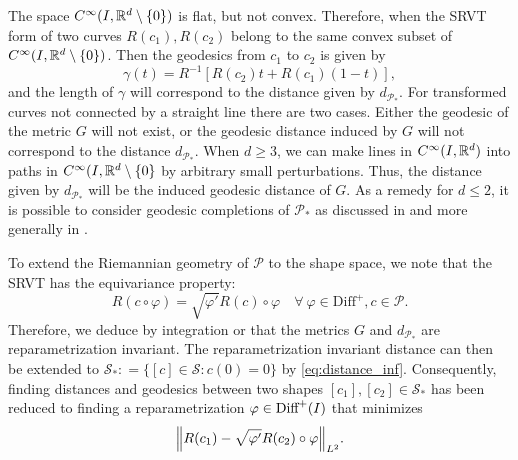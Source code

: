 The space \(C^{\infty}(I, \mathbb{R}^d \setminus \{0\}) \) is flat, but not convex. Therefore, when the SRVT form of two curves \(R(c_1), R(c_2)\) belong to the same convex subset of \(C^{\infty}(I, \mathbb{R}^d \setminus \{0\})\). Then the  geodesics from \(c_1\) to \(c_2\) is given by 
\begin{equation}
  \gamma(t) = R^{-1}[R(c_2)t +  R(c_1)(1-t)], 
\end{equation}
and the length of \(\gamma\) will correspond to the distance given by \(d_{\mathcal{P}_*}\). For transformed curves not connected by a straight line there are two cases. Either the geodesic of the metric \(G\) will not exist, or the geodesic distance induced by \(G\) will not correspond to the  distance \(d_{\mathcal{P}_*}\). When \(d \geq 3\),  we can make lines in \(C^{\infty}(I, \mathbb{R}^d )\) into paths in \(C^{\infty}(I, \mathbb{R}^d \setminus \{0\}\) by arbitrary small perturbations. Thus, the distance given by \(d_{\mathcal{P}_*}\) will be the induced geodesic distance of \(G\). As a remedy for \(d \leq 2 \), it is possible to consider geodesic completions of \(\mathcal{P}_* \) as discussed in \cite{bruveris1016_srvtexample} and more generally in \cite{bruveris2014_geocomp}. 


To extend the Riemannian geometry of \(\mathcal{P}\) to the shape space, we note that the SRVT has the equivariance property: 
\begin{equation}
  R(c \circ \varphi) = \sqrt{\varphi'}R(c) \circ \varphi \quad \forall \ \varphi \in \text{Diff}^+, c \in \mathcal{P}. 
\end{equation}
Therefore, we deduce by integration or \cite[Theomrem 3.1]{bauer2014_rprop} that the metrics \(G\) and \(d_{\mathcal{P}_*}\) are reparametrization invariant. The reparametrization invariant distance can then be extended to \(\mathcal{S}_* : = \{[c] \in \mathcal{S}: c(0)=0\}\) by \eqref{eq:distance_inf}. Consequently, finding distances and geodesics between two shapes \([c_1], [c_2]\in \mathcal{S}_*\) has been reduced to finding a reparametrization \(\varphi \in \text{Diff}^+(I)\) that minimizes 
\begin{equation} \label{eq:srvt_reparam}
  \norm{R(c_1) - \sqrt{\varphi'} R(c_2)\circ \varphi}_{L^2}. 
\end{equation}

